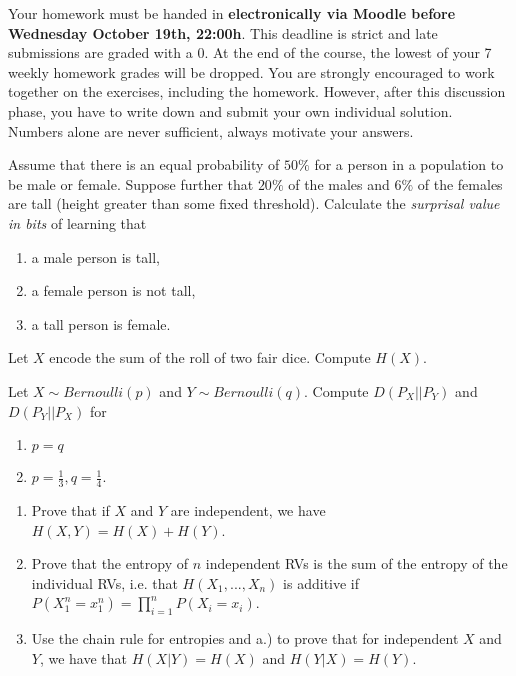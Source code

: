\documentclass[a4paper,10pt,landscape,twocolumn]{scrartcl}
\newcommand\deadline{Wednesday October 19th, 22:00h}
\begin{document}
\homeworkproblems

{\sffamily\noindent
Your homework must be handed in \textbf{electronically via Moodle before \deadline}.  This deadline is strict and late submissions are graded with a 0. At the end of the course, the lowest of your 7 weekly homework grades will be dropped. You are strongly encouraged to work together on the exercises, including the homework. However, after this discussion phase, you have to write down and submit your own individual solution. Numbers alone are never sufficient, always motivate your answers.
}

\begin{exercise}
Assume that there is an equal probability of $50\%$ for a person in a population to be male or female. Suppose further that $20\%$ of the males and $6\%$ of the females are tall (height greater than some fixed threshold). Calculate the \emph{surprisal value in bits} of learning that
\begin{enumerate}
\item a male person is tall, 
\item a female person is not tall, 
\item a tall person is female.
\end{enumerate}
\end{exercise}

\begin{exercise}
Let $X$ encode the sum of the roll of two fair dice. Compute $H(X)$.
\end{exercise}

\begin{exercise}
Let $X \sim Bernoulli(p)$ and $Y \sim Bernoulli(q)$. Compute $D(P_X || P_Y)$ and $D(P_Y || P_X)$ for 
\begin{enumerate}
\item $p=q$
\item $p=\frac 1 3, q=\frac 1 4$.
\end{enumerate}
\end{exercise}


\begin{exercise}
\begin{enumerate}
\item Prove that if $X$ and $Y$ are independent, we have $H(X,Y)=H(X) + H(Y)$. 
\item Prove that the entropy of $n$ independent RVs is the sum of the entropy of the individual RVs, i.e. that  $H(X_1, ..., X_n)$ is additive if $P(X_1^n=x_1^n) = \prod_{i = 1}^n P(X_i=x_i)$.
\item Use the chain rule for entropies and a.) to prove that for independent $X$ and $Y$, we have that $H(X|Y) = H(X)$ and $H(Y|X) = H(Y)$.
\end{enumerate}
\end{exercise}
\end{document}
